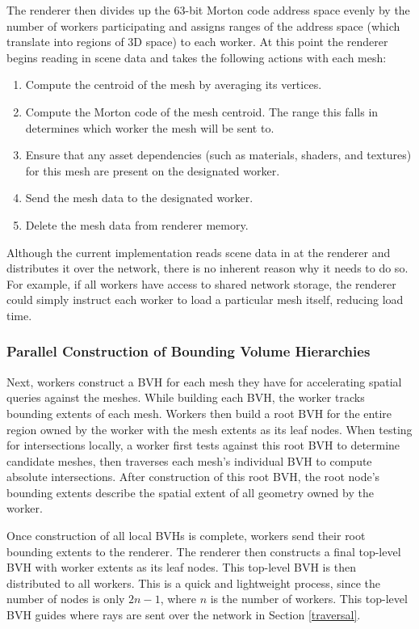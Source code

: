 \documentclass[a4paper,twoside]{article}
\begin{document}
The renderer then divides up the 63-bit Morton code address space evenly by the
number of workers participating and assigns ranges of the address space (which
translate into regions of 3D space) to each worker. At this point the renderer
begins reading in scene data and takes the following actions with each mesh:

\begin{enumerate}
    \item Compute the centroid of the mesh by averaging its vertices.
    \item Compute the Morton code of the mesh centroid. The range this falls in
        determines which worker the mesh will be sent to.
    \item Ensure that any asset dependencies (such as materials, shaders, and
        textures) for this mesh are present on the designated worker.
    \item Send the mesh data to the designated worker.
    \item Delete the mesh data from renderer memory.
\end{enumerate}

Although the current implementation reads scene data in at the renderer
and distributes it over the network, there is no inherent reason why it needs
to do so. For example, if all workers have access to shared network storage,
the renderer could simply instruct each worker to load a particular mesh itself,
reducing load time.

\subsubsection{Parallel Construction of Bounding Volume Hierarchies}
\label{parallelbvh}

Next, workers construct a BVH for each mesh they have for accelerating spatial
queries against the meshes. While building each BVH, the worker tracks bounding
extents of each mesh.  Workers then build a root BVH for the entire region owned by the worker with
the mesh extents as its leaf nodes. When testing for intersections locally, a
worker first tests against this root BVH to determine candidate meshes, then
traverses each mesh's individual BVH to compute absolute intersections. After
construction of this root BVH, the root node's bounding extents describe the
spatial extent of all geometry owned by the worker.

Once construction of all local BVHs is complete, workers send their root
bounding extents to the renderer. The renderer then constructs a final top-level
BVH with worker extents as its leaf nodes. This top-level BVH is then distributed
to all workers. This is a quick and lightweight process, since the number of nodes
is only $2n - 1$, where $n$ is the number of workers. This top-level BVH guides
where rays are sent over the network in Section \ref{traversal}.
\end{document}
